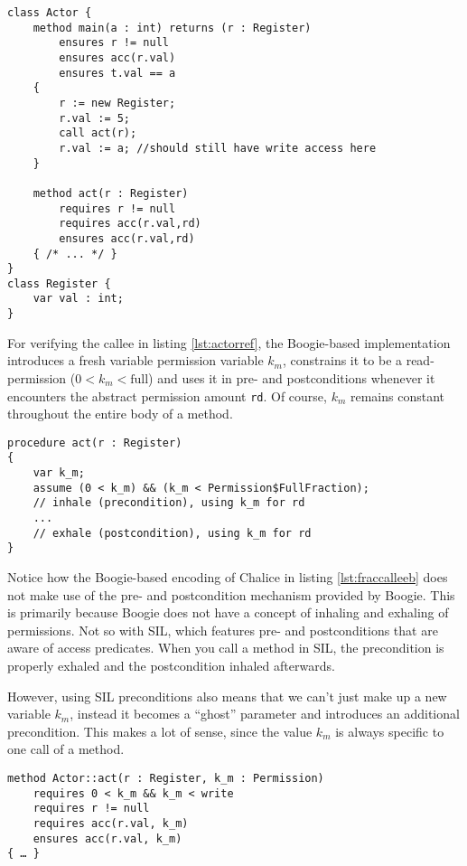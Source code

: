\begin{lstlisting}[float,label=lst:actorref,caption={A call that uses and preserves fractional read permissions.},language=Chalice]
class Actor {
	method main(a : int) returns (r : Register)
		ensures r != null
		ensures acc(r.val)
		ensures t.val == a
	{
		r := new Register;
		r.val := 5;
		call act(r);
		r.val := a; //should still have write access here
	}

	method act(r : Register)
		requires r != null
		requires acc(r.val,rd)
		ensures acc(r.val,rd)
	{ /* ... */ }
}
class Register {
	var val : int;
}
\end{lstlisting}

For verifying the callee in listing \ref{lst:actorref}, the Boogie-based implementation introduces a fresh variable permission variable $k_m$, constrains it to be a read-permission ($0<k_m<\text{full}$) and uses it in pre- and postconditions whenever it encounters the abstract permission amount \lstinline!rd!. 
Of course, $k_m$ remains constant throughout the entire body of a method.

\begin{lstlisting}[float,caption={Handling of fractional read permissions by the Boogie-based Chalice verifier.},label=lst:fraccalleeb]
procedure act(r : Register)
{
	var k_m;
	assume (0 < k_m) && (k_m < Permission$FullFraction);
	// inhale (precondition), using k_m for rd
	...
	// exhale (postcondition), using k_m for rd
}
\end{lstlisting}

Notice how the Boogie-based encoding of Chalice in listing \ref{lst:fraccalleeb} does not make use of the pre- and postcondition mechanism provided by Boogie. 
This is primarily because Boogie does not have a concept of inhaling and exhaling of permissions. 
Not so with SIL, which features pre- and postconditions that are aware of access predicates. 
When you call a method in SIL, the precondition is properly exhaled and the postcondition inhaled afterwards.

However, using SIL preconditions also means that we can't just make up a new variable $k_m$, instead it becomes a ``ghost'' parameter and introduces an additional precondition. This makes a lot of sense, since the value $k_m$ is always specific to one call of a method.

\begin{lstlisting}[float,caption={Handling of fractional read permissions by the Chalice2SIL translator},label=lst:fraccallees,language=SIL]
method Actor::act(r : Register, k_m : Permission)
	requires 0 < k_m && k_m < write
	requires r != null
	requires acc(r.val, k_m)
	ensures acc(r.val, k_m)
{ … }
\end{lstlisting}

